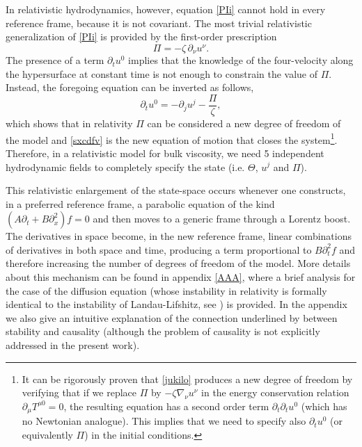 \documentclass[a4paper, amsfonts, amssymb, amsmath, reprint, showkeys, nofootinbib, twoside]{revtex4-1}
\begin{document}
In relativistic hydrodynamics, however, equation \eqref{PIi} cannot hold in every reference frame, because it is not covariant. The most trivial relativistic generalization of \eqref{PIi} is provided by the first-order prescription
\begin{equation}\label{jukilo}
\Pi = -\zeta \, \partial_\nu u^\nu.
\end{equation}
The presence of a term $\partial_t u^0$ implies that the knowledge of the four-velocity along the hypersurface at constant time is not enough to constrain the value of $\Pi$. Instead, the foregoing equation can be inverted as follows,
\begin{equation}\label{sxcdfv}
\partial_t u^0 = -\partial_j u^j -\dfrac{\Pi}{\zeta},
\end{equation} 
which shows that in relativity $\Pi$ can be considered a new degree of freedom of the model \citep{Hiscock_Insatibility_first_order} and \eqref{sxcdfv} is the new equation of motion that closes the system\footnote{
It can be rigorously proven that \eqref{jukilo} produces a new degree of freedom by verifying that if we replace $\Pi$ by $-\zeta \nabla_\nu u^\nu$ in the energy conservation relation $\partial_\mu T^{\mu 0}=0$, the resulting equation has a second order term $\partial_t \partial_t u^0$ (which has no Newtonian analogue). This implies that we need to specify also $\partial_t u^0$ (or equivalently $\Pi$) in the initial conditions.
}. Therefore, in a relativistic model for bulk viscosity, we need 5 independent hydrodynamic fields to completely specify the state (i.e. $\Theta$, $u^j$ and $\Pi$).

This  relativistic enlargement of the state-space occurs whenever one constructs, in a preferred reference frame, a parabolic equation of the kind $(A\partial_t+B\partial_x^2)f=0$ and then moves to a generic frame through a Lorentz boost. The derivatives in space become, in the new reference frame, linear combinations of derivatives in both space and time, producing a term proportional to $B\partial_{t}^2 f$ and therefore increasing the number of degrees of freedom of the model. More details about this mechanism can be found in appendix \ref{AAA}, where a brief analysis for the case of the diffusion equation (whose instability in relativity is formally identical to the instability of Landau-Lifshitz, see \cite{Kost2000}) is provided. In the appendix we also give an intuitive explanation of the connection underlined by \cite{Hishcock1983} between stability and causality (although the problem of causality is not explicitly addressed in the present work).
 
\end{document}
